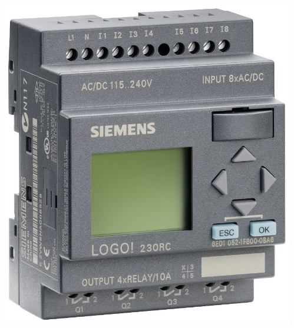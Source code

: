 \documentclass{beamer}
\begin{document}
\begin{frame}[fragile]{}
\begin{columns}[T]
\begin{column}{.49\textwidth}
\begin{tcolorbox}[adjusted title={\centering\large Industrial Systems}]
\begin{columns}
\begin{column}{.3\textwidth}
{                            \includegraphics{plc}
                        }
                    \end{column}
                    \begin{column}{.3\textwidth}
                    \end{column}
                \end{columns}

\end{tcolorbox}
\end{column}
\end{columns}
\end{frame}
\end{document}
